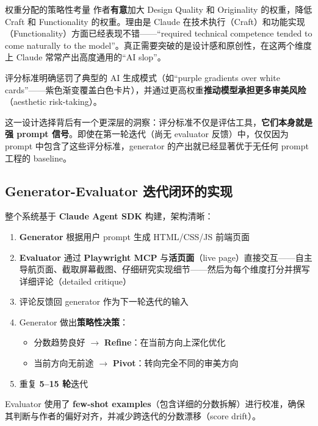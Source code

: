 \begin{importantbox}{权重分配的策略性考量}
作者\textbf{有意}加大 Design Quality 和 Originality 的权重，降低 Craft 和 Functionality 的权重。理由是 Claude 在技术执行（Craft）和功能实现（Functionality）方面已经表现不错——``required technical competence tended to come naturally to the model''。真正需要突破的是设计感和原创性，在这两个维度上 Claude 常常产出高度通用的``AI slop''。

评分标准明确惩罚了典型的 AI 生成模式（如``purple gradients over white cards''——紫色渐变覆盖白色卡片），并通过更高权重\textbf{推动模型承担更多审美风险}（aesthetic risk-taking）。
\end{importantbox}

这一设计选择背后有一个更深层的洞察：评分标准不仅是评估工具，\textbf{它们本身就是强 prompt 信号}。即使在第一轮迭代（尚无 evaluator 反馈）中，仅仅因为 prompt 中包含了这些评分标准，generator 的产出就已经显著优于无任何 prompt 工程的 baseline。

\subsection{Generator-Evaluator 迭代闭环的实现}

整个系统基于 \textbf{Claude Agent SDK} 构建，架构清晰：

\begin{enumerate}[leftmargin=1.5em]
    \item \textbf{Generator} 根据用户 prompt 生成 HTML/CSS/JS 前端页面
    \item \textbf{Evaluator} 通过 \textbf{Playwright MCP} 与\textbf{活页面}（live page）直接交互——自主导航页面、截取屏幕截图、仔细研究实现细节——然后为每个维度打分并撰写详细评论（detailed critique）
    \item 评论反馈回 generator 作为下一轮迭代的输入
    \item Generator 做出\textbf{策略性决策}：
    \begin{itemize}[leftmargin=1em]
        \item 分数趋势良好 $\to$ \textbf{Refine}：在当前方向上深化优化
        \item 当前方向无前途 $\to$ \textbf{Pivot}：转向完全不同的审美方向
    \end{itemize}
    \item 重复 \textbf{5--15 轮}迭代
\end{enumerate}

Evaluator 使用了 \textbf{few-shot examples}（包含详细的分数拆解）进行校准，确保其判断与作者的偏好对齐，并减少跨迭代的分数漂移（score drift）。

